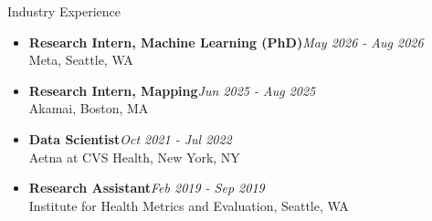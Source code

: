 \documentclass{resume} %
\begin{document}
\begin{rSection}{Industry Experience}
\begin{itemize}
\item {\bf Research Intern, Machine Learning (PhD)}\hfill {\em May 2026 - Aug 2026}\\
Meta, Seattle, WA
\item {\bf Research Intern, Mapping}\hfill {\em Jun 2025 - Aug 2025}\\
Akamai, Boston, MA
\item {\bf Data Scientist}\hfill {\em Oct 2021 - Jul 2022}\\
Aetna at CVS Health, New York, NY
\item {\bf Research Assistant}\hfill {\em Feb 2019 - Sep 2019}\\
Institute for Health Metrics and Evaluation, Seattle, WA
\end{itemize}
\end{rSection}
\end{document}
